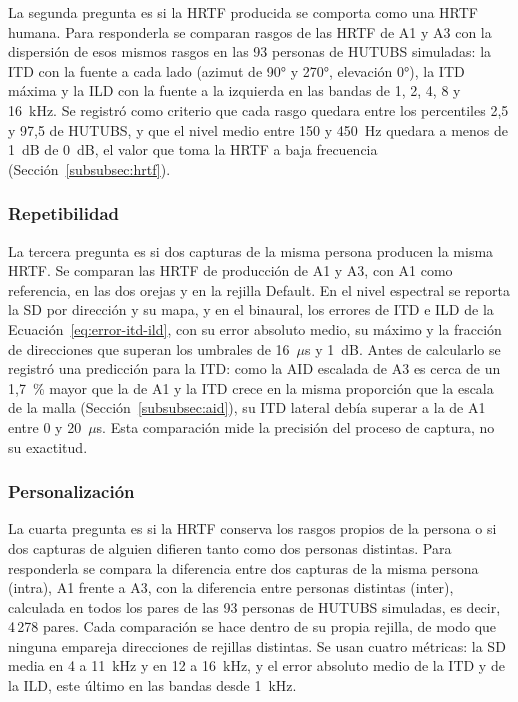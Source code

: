 La segunda pregunta es si la HRTF producida se comporta como una HRTF humana. Para responderla se comparan rasgos de las HRTF de A1 y A3 con la dispersión de esos mismos rasgos en las 93 personas de HUTUBS simuladas: la ITD con la fuente a cada lado (azimut de 90° y 270°, elevación 0°), la ITD máxima y la ILD con la fuente a la izquierda en las bandas de 1, 2, 4, 8 y 16~kHz. Se registró como criterio que cada rasgo quedara entre los percentiles 2,5 y 97,5 de HUTUBS, y que el nivel medio entre 150 y 450~Hz quedara a menos de 1~dB de 0~dB, el valor que toma la HRTF a baja frecuencia (Sección~\ref{subsubsec:hrtf}).

\subsubsection{Repetibilidad}

La tercera pregunta es si dos capturas de la misma persona producen la misma HRTF. Se comparan las HRTF de producción de A1 y A3, con A1 como referencia, en las dos orejas y en la rejilla Default. En el nivel espectral se reporta la SD por dirección y su mapa, y en el binaural, los errores de ITD e ILD de la Ecuación~\eqref{eq:error-itd-ild}, con su error absoluto medio, su máximo y la fracción de direcciones que superan los umbrales de 16~$\mu$s y 1~dB. Antes de calcularlo se registró una predicción para la ITD: como la AID escalada de A3 es cerca de un 1,7~\% mayor que la de A1 y la ITD crece en la misma proporción que la escala de la malla (Sección~\ref{subsubsec:aid}), su ITD lateral debía superar a la de A1 entre 0 y 20~$\mu$s. Esta comparación mide la precisión del proceso de captura, no su exactitud.

\subsubsection{Personalización}

La cuarta pregunta es si la HRTF conserva los rasgos propios de la persona o si dos capturas de alguien difieren tanto como dos personas distintas. Para responderla se compara la diferencia entre dos capturas de la misma persona (intra), A1 frente a A3, con la diferencia entre personas distintas (inter), calculada en todos los pares de las 93 personas de HUTUBS simuladas, es decir, 4\,278 pares. Cada comparación se hace dentro de su propia rejilla, de modo que ninguna empareja direcciones de rejillas distintas. Se usan cuatro métricas: la SD media en 4 a 11~kHz y en 12 a 16~kHz, y el error absoluto medio de la ITD y de la ILD, este último en las bandas desde 1~kHz.

